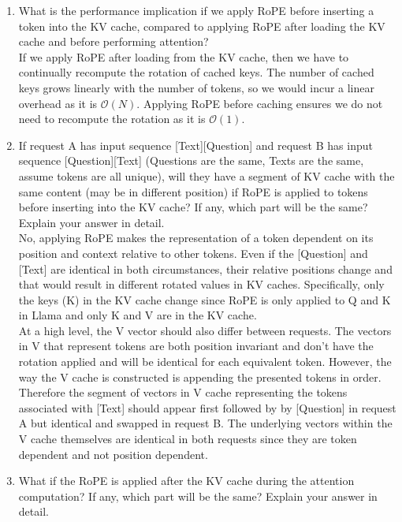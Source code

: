 \documentclass[12pt]{article}
\begin{document}
\begin{enumerate}[label=\textbf{Q\arabic*.}]
\begin{enumerate}
        \item What is the performance implication if we apply RoPE before inserting a token into the KV cache, compared to applying RoPE after loading the KV cache and before performing attention? \\

        If we apply RoPE after loading from the KV cache, then we have to continually recompute the rotation of cached keys. The number of cached keys grows linearly with the number of tokens, so we would incur a linear overhead as it is $\mathcal{O}\left(N\right)$. Applying RoPE before caching ensures we do not need to recompute the rotation as it is $\mathcal{O}\left(1\right)$. \\

        \item If request A has input sequence [Text][Question] and request B has input sequence [Question][Text] (Questions are the same, Texts are the same, assume tokens are all unique), will they have a segment of KV cache with the same content (may be in different position) if RoPE is applied to tokens before inserting into the KV cache? If any, which part will be the same? Explain your answer in detail. \\

        No, applying RoPE makes the representation of a token dependent on its position and context relative to other tokens. Even if the [Question] and [Text] are identical in both circumstances, their relative positions change and that would result in different rotated values in KV caches. Specifically, only the keys (K) in the KV cache change since RoPE is only applied to Q and K in Llama and only K and V are in the KV cache. \\ 
        
        At a high level, the V vector should also differ between requests. The vectors in V that represent tokens are both position invariant and don't have the rotation applied and will be identical for each equivalent token. However, the way the V cache is constructed is appending the presented tokens in order. Therefore the segment of vectors in V cache representing the tokens associated with [Text] should appear first followed by by [Question] in request A but identical and swapped in request B. The underlying vectors within the V cache themselves are identical in both requests since they are token dependent and not position dependent. \\
        
        \item What if the RoPE is applied after the KV cache during the attention computation? If any, which part will be the same? Explain your answer in detail. \\


\end{enumerate}
\end{enumerate}
\end{document}
